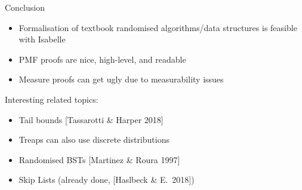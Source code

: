 \documentclass[%
	sans,
	12pt,
]{beamer}
\begin{document}

\begin{frame}{Conclusion}
\begin{itemize}
\item Formalisation of textbook randomised algorithms/data structures is feasible with Isabelle\pause
\item PMF proofs are nice, high-level, and readable\pause
\item Measure proofs can get ugly due to measurability issues\pause
\end{itemize}
Interesting related topics:\pause
\begin{itemize}
\item Tail bounds [Tassarotti \& Harper 2018]\pause
\item Treaps can also use discrete distributions\pause
\item Randomised BSTs [Martinez \& Roura 1997]\pause
\item Skip Lists (already done, [Haslbeck \& E.\ 2018])
\end{itemize}
\end{frame}
\end{document}
